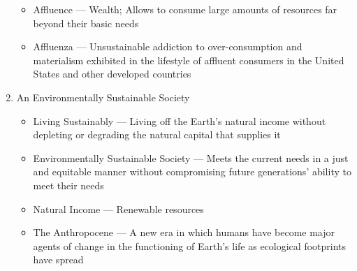 \documentclass[12pt]{article}
\begin{document}
\begin{enumerate}
\begin{itemize}
\begin{itemize}
        \end{itemize}

      \item Affluence — Wealth; Allows to consume large amounts of resources far beyond their basic needs

      \item Affluenza — Unsustainable addiction to over-consumption and materialism exhibited in the lifestyle of affluent consumers in the United States and other developed countries

    \end{itemize}

  \item An Environmentally Sustainable Society

    \begin{itemize}

      \item Living Sustainably — Living off the Earth's natural income without depleting or degrading the natural capital that supplies it

      \item Environmentally Sustainable Society — Meets the current needs in a just and equitable manner without compromising future generations' ability to meet their needs

      \item Natural Income — Renewable resources

      \item The Anthropocene — A new era in which humans have become major agents of change in the functioning of Earth's life as ecological footprints have spread

    \end{itemize}

\end{enumerate}
\end{document}
